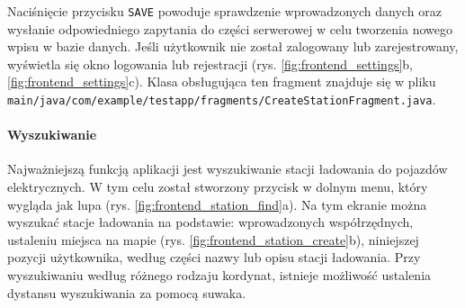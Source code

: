 Naciśnięcie przycisku \texttt{SAVE} powoduje sprawdzenie wprowadzonych danych oraz wysłanie odpowiedniego zapytania do części serwerowej w celu tworzenia nowego wpisu w bazie danych. Jeśli użytkownik nie został zalogowany lub zarejestrowany, wyświetla się okno logowania lub rejestracji (rys. \ref{fig:frontend_settings}b, \ref{fig:frontend_settings}c).
Klasa obsługująca ten fragment znajduje się w pliku \texttt{main/java/com/example/testapp/fragments/CreateStationFragment.java}.

\paragraph{Wyszukiwanie\newline}
Najważniejszą funkcją aplikacji jest wyszukiwanie stacji ładowania do pojazdów elektrycznych. W tym celu został stworzony przycisk w dolnym menu, który wygląda jak lupa (rys. \ref{fig:frontend_station_find}a).
Na tym ekranie można wyszukać stacje ładowania na podstawie: wprowadzonych współrzędnych, ustaleniu miejsca na mapie (rys. \ref{fig:frontend_station_create}b), niniejszej pozycji użytkownika, według części nazwy lub opisu stacji ładowania.
Przy wyszukiwaniu według różnego rodzaju kordynat, istnieje możliwość ustalenia dystansu wyszukiwania za pomocą suwaka.
